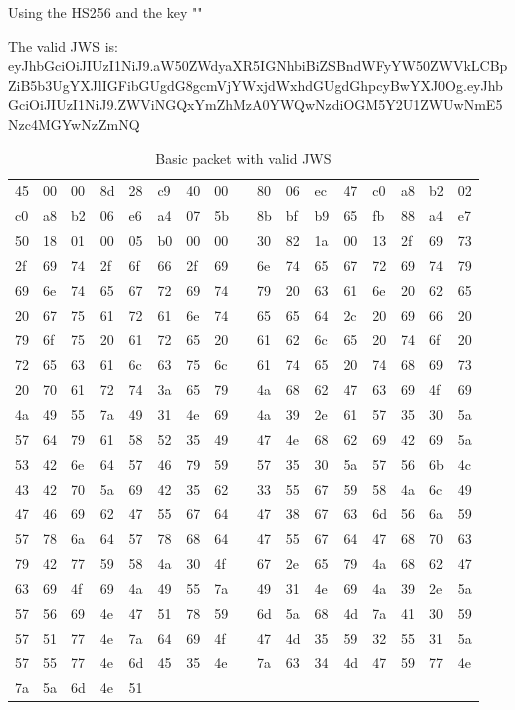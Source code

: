 Using the HS256 and the key ""


The valid JWS is: eyJhbGciOiJIUzI1NiJ9.aW50ZWdyaXR5IGNhbiBiZSBndWFyYW50ZWVkLCBpZiB5b3UgYXJlIGFibGUgdG8gcmVjYWxjdWxhdGUgdGhpcyBwYXJ0Og.eyJhbGciOiJIUzI1NiJ9.ZWViNGQxYmZhMzA0YWQwNzdiOGM5Y2U1ZWUwNmE5Nzc4MGYwNzZmNQ



\begin{table}[]
\centering
\begin{tabular}{lllllllllllllllll}
45 & 00 & 00 & 8d & 28 & c9 & 40 & 00 &  & 80 & 06 & ec & 47 & c0 & a8 & b2 & 02 \\
c0 & a8 & b2 & 06 & e6 & a4 & 07 & 5b &  & 8b & bf & b9 & 65 & fb & 88 & a4 & e7 \\
50 & 18 & 01 & 00 & 05 & b0 & 00 & 00 &  & 30 & 82 & 1a & 00 & 13 & 2f & 69 & 73 \\
2f & 69 & 74 & 2f & 6f & 66 & 2f & 69 &  & 6e & 74 & 65 & 67 & 72 & 69 & 74 & 79 \\
69 & 6e & 74 & 65 & 67 & 72 & 69 & 74 &  & 79 & 20 & 63 & 61 & 6e & 20 & 62 & 65 \\
20 & 67 & 75 & 61 & 72 & 61 & 6e & 74 &  & 65 & 65 & 64 & 2c & 20 & 69 & 66 & 20 \\
79 & 6f & 75 & 20 & 61 & 72 & 65 & 20 &  & 61 & 62 & 6c & 65 & 20 & 74 & 6f & 20 \\
72 & 65 & 63 & 61 & 6c & 63 & 75 & 6c &  & 61 & 74 & 65 & 20 & 74 & 68 & 69 & 73 \\
20 & 70 & 61 & 72 & 74 & 3a & 65 & 79 &  & 4a & 68 & 62 & 47 & 63 & 69 & 4f & 69 \\
4a & 49 & 55 & 7a & 49 & 31 & 4e & 69 &  & 4a & 39 & 2e & 61 & 57 & 35 & 30 & 5a \\
57 & 64 & 79 & 61 & 58 & 52 & 35 & 49 &  & 47 & 4e & 68 & 62 & 69 & 42 & 69 & 5a \\
53 & 42 & 6e & 64 & 57 & 46 & 79 & 59 &  & 57 & 35 & 30 & 5a & 57 & 56 & 6b & 4c \\
43 & 42 & 70 & 5a & 69 & 42 & 35 & 62 &  & 33 & 55 & 67 & 59 & 58 & 4a & 6c & 49 \\
47 & 46 & 69 & 62 & 47 & 55 & 67 & 64 &  & 47 & 38 & 67 & 63 & 6d & 56 & 6a & 59 \\
57 & 78 & 6a & 64 & 57 & 78 & 68 & 64 &  & 47 & 55 & 67 & 64 & 47 & 68 & 70 & 63 \\
79 & 42 & 77 & 59 & 58 & 4a & 30 & 4f &  & 67 & 2e & 65 & 79 & 4a & 68 & 62 & 47 \\
63 & 69 & 4f & 69 & 4a & 49 & 55 & 7a &  & 49 & 31 & 4e & 69 & 4a & 39 & 2e & 5a \\
57 & 56 & 69 & 4e & 47 & 51 & 78 & 59 &  & 6d & 5a & 68 & 4d & 7a & 41 & 30 & 59 \\
57 & 51 & 77 & 4e & 7a & 64 & 69 & 4f &  & 47 & 4d & 35 & 59 & 32 & 55 & 31 & 5a \\
57 & 55 & 77 & 4e & 6d & 45 & 35 & 4e &  & 7a & 63 & 34 & 4d & 47 & 59 & 77 & 4e \\
7a & 5a & 6d & 4e & 51
\end{tabular}
\caption{Basic packet with valid JWS}
\label{tab:my-table}
\end{table}
